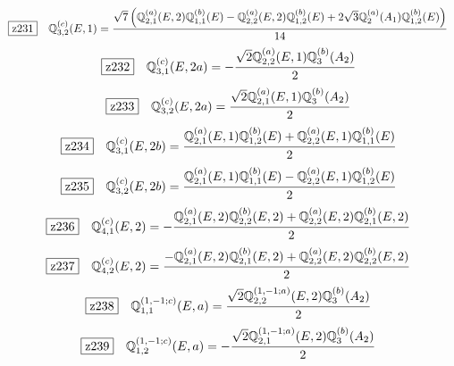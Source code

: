 \documentclass[fleqn,10pt,landscape]{jsarticle}
\begin{document}
\begin{dmath*}
\hspace*{3mm}\fbox{z231}\quad \mathbb{Q}_{3,2}^{(c)}(E,1)=\frac{\sqrt{7} \left(\mathbb{Q}_{2,1}^{(a)}(E,2) \mathbb{Q}_{1,1}^{(b)}(E) - \mathbb{Q}_{2,2}^{(a)}(E,2) \mathbb{Q}_{1,2}^{(b)}(E) + 2 \sqrt{3} \mathbb{Q}_{2}^{(a)}(A_{1}) \mathbb{Q}_{1,2}^{(b)}(E)\right)}{14}
\end{dmath*}
\begin{dmath*}
\hspace*{3mm}\fbox{z232}\quad \mathbb{Q}_{3,1}^{(c)}(E,2a)=- \frac{\sqrt{2} \mathbb{Q}_{2,2}^{(a)}(E,1) \mathbb{Q}_{3}^{(b)}(A_{2})}{2}
\end{dmath*}
\begin{dmath*}
\hspace*{3mm}\fbox{z233}\quad \mathbb{Q}_{3,2}^{(c)}(E,2a)=\frac{\sqrt{2} \mathbb{Q}_{2,1}^{(a)}(E,1) \mathbb{Q}_{3}^{(b)}(A_{2})}{2}
\end{dmath*}
\begin{dmath*}
\hspace*{3mm}\fbox{z234}\quad \mathbb{Q}_{3,1}^{(c)}(E,2b)=\frac{\mathbb{Q}_{2,1}^{(a)}(E,1) \mathbb{Q}_{1,2}^{(b)}(E) + \mathbb{Q}_{2,2}^{(a)}(E,1) \mathbb{Q}_{1,1}^{(b)}(E)}{2}
\end{dmath*}
\begin{dmath*}
\hspace*{3mm}\fbox{z235}\quad \mathbb{Q}_{3,2}^{(c)}(E,2b)=\frac{\mathbb{Q}_{2,1}^{(a)}(E,1) \mathbb{Q}_{1,1}^{(b)}(E) - \mathbb{Q}_{2,2}^{(a)}(E,1) \mathbb{Q}_{1,2}^{(b)}(E)}{2}
\end{dmath*}
\begin{dmath*}
\hspace*{3mm}\fbox{z236}\quad \mathbb{Q}_{4,1}^{(c)}(E,2)=- \frac{\mathbb{Q}_{2,1}^{(a)}(E,2) \mathbb{Q}_{2,2}^{(b)}(E,2) + \mathbb{Q}_{2,2}^{(a)}(E,2) \mathbb{Q}_{2,1}^{(b)}(E,2)}{2}
\end{dmath*}
\begin{dmath*}
\hspace*{3mm}\fbox{z237}\quad \mathbb{Q}_{4,2}^{(c)}(E,2)=\frac{- \mathbb{Q}_{2,1}^{(a)}(E,2) \mathbb{Q}_{2,1}^{(b)}(E,2) + \mathbb{Q}_{2,2}^{(a)}(E,2) \mathbb{Q}_{2,2}^{(b)}(E,2)}{2}
\end{dmath*}
\begin{dmath*}
\hspace*{3mm}\fbox{z238}\quad \mathbb{Q}_{1,1}^{(1,-1;c)}(E,a)=\frac{\sqrt{2} \mathbb{Q}_{2,2}^{(1,-1;a)}(E,2) \mathbb{Q}_{3}^{(b)}(A_{2})}{2}
\end{dmath*}
\begin{dmath*}
\hspace*{3mm}\fbox{z239}\quad \mathbb{Q}_{1,2}^{(1,-1;c)}(E,a)=- \frac{\sqrt{2} \mathbb{Q}_{2,1}^{(1,-1;a)}(E,2) \mathbb{Q}_{3}^{(b)}(A_{2})}{2}
\end{dmath*}
\end{document}
